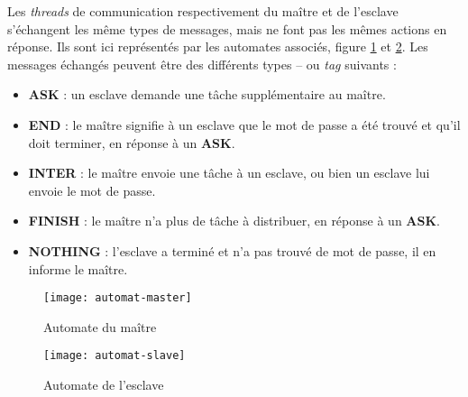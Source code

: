 Les \emph{threads} de communication respectivement du maître et de l'esclave s'échangent les même types de messages, mais ne font pas les mêmes actions en réponse. Ils sont ici représentés par les automates associés, figure \ref{fig:master} et \ref{fig:slave}. Les messages échangés peuvent être des différents types -- ou \emph{tag} suivants :
\begin{itemize}
\item \textbf{ASK} : un esclave demande une tâche supplémentaire au maître.
\item \textbf{END} : le maître signifie à un esclave que le mot de passe a été trouvé et qu'il doit terminer, en réponse à un \textbf{ASK}.
\item \textbf{INTER} : le maître envoie une tâche à un esclave, ou bien un esclave lui envoie le mot de passe. 
\item \textbf{FINISH} : le maître n'a plus de tâche à distribuer, en réponse à un \textbf{ASK}.
\item \textbf{NOTHING} : l'esclave a terminé et n'a pas trouvé de mot de passe, il en informe le maître.
\end{itemize}

\begin{figure}[h!]
\centering
\texttt{[image: automat-master]}
\caption{Automate du maître}
\label{fig:master}
\end{figure}


\begin{figure}[h!]
\centering
\texttt{[image: automat-slave]}
\caption{Automate de l'esclave}
\label{fig:slave}
\end{figure}
